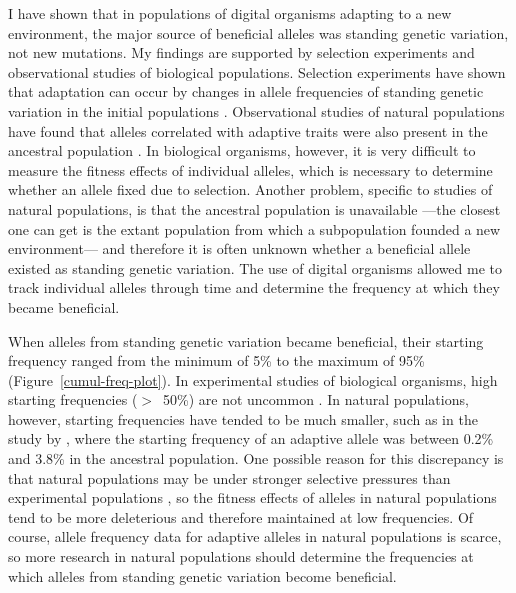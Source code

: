 \begin{doublespace}
I have shown that in populations of digital organisms
adapting to a new environment,
the major source of beneficial alleles
was standing genetic variation, not new mutations.
%
My findings are supported by
selection experiments and observational studies
of biological populations.
%
Selection experiments have shown that
adaptation can occur by changes in allele frequencies
of standing genetic variation in the initial populations
\citep[e.g.,][]{fed97,sca09,teo09}.
%
Observational studies of natural populations
have found that alleles correlated with adaptive traits
were also present in the ancestral population
\citep[e.g.,][]{col05,myl05}.
%
%
In biological organisms, however,
it is very difficult to measure
the fitness effects of individual alleles,
which is necessary to determine whether
an allele fixed due to selection.
%
Another problem, specific to studies of natural populations,
is that the ancestral population is unavailable%
---the closest one can get is the extant population
from which a subpopulation founded a new environment---%
and therefore it is often unknown
whether a beneficial allele existed as standing genetic variation.
%
The use of digital organisms allowed me to track
individual alleles through time
and determine the frequency at which they became beneficial.




When alleles from standing genetic variation became beneficial,
their starting frequency ranged from the minimum of 5\%
to the maximum of 95\% (Figure~\ref{cumul-freq-plot}).
%
In experimental studies of biological organisms,
high starting frequencies ($>$~50\%) are not uncommon
\citep[e.g.,][]{fed97,sca09}.
%
In natural populations, however,
starting frequencies have tended to be much smaller,
such as in the study by \citet{col05},
where the starting frequency of an adaptive allele
was between 0.2\% and 3.8\% in the ancestral population.
%
One possible reason for this discrepancy
is that natural populations may be under stronger selective pressures
than experimental populations \citep{ell08},
so the fitness effects of alleles in natural populations
tend to be more deleterious and therefore maintained at low frequencies.
%
Of course, allele frequency data for adaptive alleles
in natural populations is scarce,
so more research in natural populations
should determine the frequencies at which alleles
from standing genetic variation become beneficial.




\end{doublespace}
